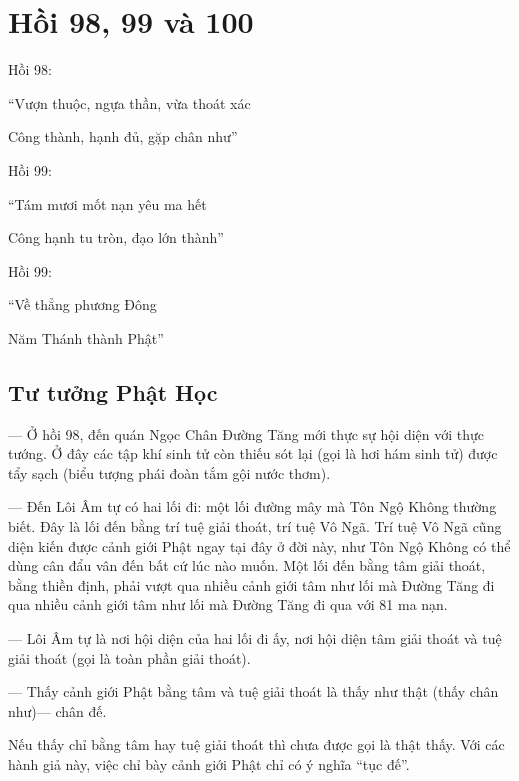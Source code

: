 \chapter{Hồi 98, 99 và 100} %
\label{cha:hoi_98_99_100}

Hồi 98:

\begin{itshape}
``Vượn thuộc, ngựa thần, vừa thoát xác

Công thành, hạnh đủ, gặp chân như''
\end{itshape}

Hồi 99:

\begin{itshape}
``Tám mươi mốt nạn yêu ma hết

Công hạnh tu tròn, đạo lớn thành''
\end{itshape}

Hồi 99:

\begin{itshape}
``Về thẳng phương Đông

Năm Thánh thành Phật''
\end{itshape}

\section{Tư tưởng Phật Học} %
\label{sec:98_99_100_phat_hoc}

— Ở hồi 98, đến quán Ngọc Chân Đường Tăng mới thực sự hội diện với thực tướng. Ở đây các tập khí sinh tử còn thiếu sót lại (gọi là hơi hám sinh tử) được tẩy sạch (biểu tượng phái đoàn tắm gội nước thơm).

— Đến Lôi Âm tự có hai lối đi: một lối đường mây mà Tôn Ngộ Không thường biết. Đây là lối đến bằng trí tuệ giải thoát, trí tuệ Vô Ngã. Trí tuệ Vô Ngã cũng diện kiến được cảnh giới Phật ngay tại đây ở đời này, như Tôn Ngộ Không có thể dùng cân đẩu vân đến bất cứ lúc nào muốn. Một lối đến bằng tâm giải thoát, bằng thiền định, phải vượt qua nhiều cảnh giới tâm như lối mà Đường Tăng đi qua nhiều cảnh giới tâm như lối mà Đường Tăng đi qua với 81 ma nạn.

— Lôi Âm tự là nơi hội diện của hai lối đi ấy, nơi hội diện tâm giải thoát và tuệ giải thoát (gọi là toàn phần giải thoát).

— Thấy cảnh giới Phật bằng tâm và tuệ giải thoát là thấy như thật (thấy chân như)— chân đế.

Nếu thấy chỉ bằng tâm hay tuệ giải thoát thì chưa được gọi là thật thấy. Với các hành giả này, việc chỉ bày cảnh giới Phật chỉ có ý nghĩa ``tục đế''.

